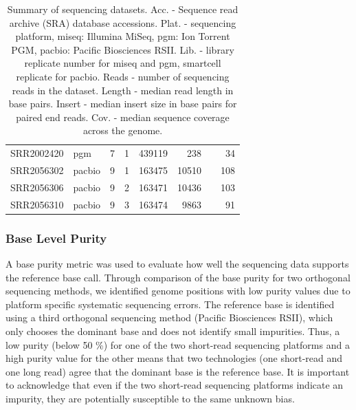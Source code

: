 \documentclass[smallextended]{svjour3}\usepackage[]{graphicx}\usepackage[]{color}
\begin{document}
\begin{table}[ht]
\begin{tabular}{llrrrrrr}
  SRR2002420 & pgm & 7 & 1 & 439119 & 238 &  & 34 \\ 
  SRR2056302 & pacbio & 9 & 1 & 163475 & 10510 &  & 108 \\ 
  SRR2056306 & pacbio & 9 & 2 & 163471 & 10436 &  & 103 \\ 
  SRR2056310 & pacbio & 9 & 3 & 163474 & 9863 &  & 91 \\ 
   \hline
\end{tabular}
\caption{Summary of sequencing datasets. Acc. - Sequence read archive (SRA) database accessions. Plat. - sequencing platform, miseq: Illumina MiSeq, pgm: Ion Torrent PGM, pacbio: Pacific Biosciences RSII. Lib. - library replicate number for miseq and pgm, smartcell replicate for pacbio. Reads - number of sequencing reads in the dataset. Length - median read length in base pairs. 
      Insert - median insert size in base pairs for paired end reads. 
      Cov. - median sequence coverage across the genome.} 
\label{Table:seqTable}
\end{table}



\subsubsection{Base Level Purity}


A base purity metric was used to evaluate how well the sequencing data supports the reference base call. Through comparison of the base purity for two orthogonal sequencing methods, we identified genome positions with low purity values due to platform specific systematic sequencing errors. 
The reference base is identified using a third orthogonal sequencing method (Pacific Biosciences RSII), which only chooses the dominant base and does not identify small impurities. 
Thus, a low purity (below 50 \%) for one of the two short-read sequencing platforms and a high purity value for the other means that two technologies (one short-read and one long read) agree that the dominant base is the reference base. 
It is important to acknowledge that even if the two short-read sequencing platforms indicate an impurity, they are potentially susceptible to the same unknown bias. 
\end{document}
